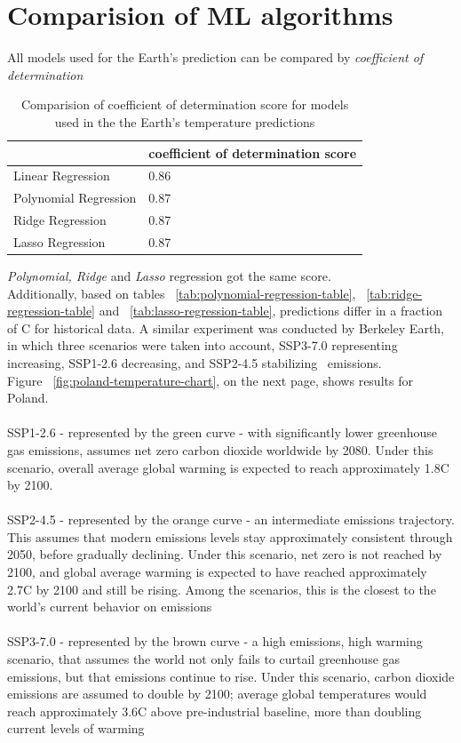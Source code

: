 \section{Comparision of ML algorithms}
All models used for the Earth's prediction can be compared by \textit{coefficient of determination}\cite{coefficient}
\begin{table}[ht]
\begin{tabular}{ |p{5cm}||p{6cm}|  }
 \hline
 & \textbf{coefficient of determination score} \\
 \hline
Linear Regression &  0.86  \\
Polynomial Regression &  0.87  \\
Ridge Regression   &  0.87  \\
Lasso Regression   &  0.87  \\
 \hline
\end{tabular}
\caption{Comparision of coefficient of determination score for models used in the the Earth's temperature predictions} 
\label{tab:coefficient-table}
\end{table}
\textit{Polynomial, Ridge} and \textit{Lasso} regression got the same score. 
\\Additionally, based on tables ~\ref{tab:polynomial-regression-table}, ~\ref{tab:ridge-regression-table} and ~\ref{tab:lasso-regression-table}, predictions differ in a fraction of \degree C for historical data.
A similar experiment was conducted by Berkeley Earth, in which three scenarios were taken into account, SSP3-7.0 representing increasing, SSP1-2.6 decreasing, and SSP2-4.5 stabilizing \coo\ emissions.
\\Figure ~\ref{fig:poland-temperature-chart}, on the next page, shows results for Poland.
\\
\\SSP1-2.6 - represented by the green curve - with significantly lower greenhouse gas emissions, assumes net zero carbon dioxide worldwide by 2080. Under this scenario, overall average global warming is expected to reach approximately 1.8\degree C by 2100.
\\
\\SSP2-4.5 - represented by the orange curve - an intermediate emissions trajectory. This assumes that modern emissions levels stay approximately consistent through 2050, before gradually declining.  Under this scenario, net zero is not reached by 2100, and global average warming is expected to have reached approximately 2.7\degree C by 2100 and still be rising.  Among the scenarios, this is the closest to the world’s current behavior on emissions
\\
\\SSP3-7.0 - represented by the brown curve - a high emissions, high warming scenario, that assumes the world not only fails to curtail greenhouse gas emissions, but that emissions continue to rise. Under this scenario, carbon dioxide emissions are assumed to double by 2100; average global temperatures would reach approximately 3.6\degree C above pre-industrial baseline, more than doubling current levels of warming

